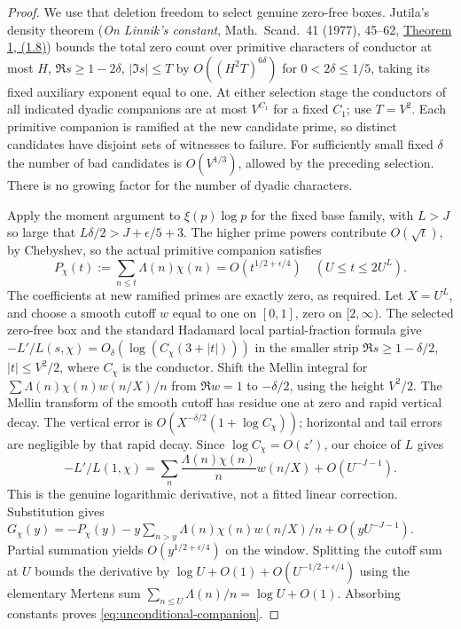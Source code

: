 \begin{proof}
We use that deletion freedom to select genuine zero-free boxes.
Jutila's density theorem (\emph{On Linnik's constant},
Math.\ Scand.\ 41 (1977), 45--62,
\href{https://www.mscand.dk/article/download/11701/9717}{Theorem 1,
(1.8)}) bounds the total zero count over primitive characters of
conductor at most \(H\), \(\Re s\ge1-2\delta\), \(|\Im s|\le T\)
by \(O((H^2T)^{6\delta})\) for \(0<2\delta\le1/5\), taking its
fixed auxiliary exponent equal to one. At either selection stage
the conductors of all indicated dyadic companions are at most
\(V^{C_1}\) for a fixed \(C_1\); use \(T=V^2\).
Each primitive companion is ramified at the new candidate prime,
so distinct candidates have disjoint sets of witnesses to failure.
For sufficiently small fixed \(\delta\) the number of bad candidates
is \(O(V^{1/3})\), allowed by the preceding selection.
There is no growing factor for the number of dyadic characters.

Apply the moment argument to \(\xi(p)\log p\) for the fixed base
family, with \(L>J\) so large that
\(L\delta/2>J+\epsilon/5+3\).
The higher prime powers contribute \(O(\sqrt t)\), by Chebyshev,
so the actual primitive companion satisfies
\[
 P_\chi(t):=\sum_{n\le t}\Lambda(n)\chi(n)
      =O(t^{1/2+\epsilon/4})\quad(U\le t\le2U^L).
\]
The coefficients at new ramified primes are exactly zero, as
required. Let \(X=U^L\), and choose a smooth cutoff \(w\) equal
to one on \([0,1]\), zero on \([2,\infty)\).
The selected zero-free box and the standard Hadamard local
partial-fraction formula give
\(-L'/L(s,\chi)=O_\delta(\log(C_\chi(3+|t|)))\) in the smaller
strip \(\Re s\ge1-\delta/2\), \(|t|\le V^2/2\), where
\(C_\chi\) is the conductor. Shift the Mellin integral for
\(\sum \Lambda(n)\chi(n)w(n/X)/n\) from \(\Re w=1\) to
\(-\delta/2\), using the height \(V^2/2\).  The Mellin transform of
the smooth cutoff has residue one at zero and rapid vertical decay.
The vertical error is \(O(X^{-\delta/2}(1+\log C_\chi))\);
horizontal and tail errors are negligible by that rapid decay.
Since \(\log C_\chi=O(z')\), our choice of \(L\) gives
\[
 -L'/L(1,\chi)=\sum_n\frac{\Lambda(n)\chi(n)}n w(n/X)
                  +O(U^{-J-1}).
\]
This is the genuine logarithmic derivative, not a fitted
linear correction.  Substitution gives
\(G_\chi(y)=-P_\chi(y)-y\sum_{n>y}\Lambda(n)\chi(n)w(n/X)/n
+O(yU^{-J-1})\).
Partial summation yields \(O(y^{1/2+\epsilon/4})\) on the window.
Splitting the cutoff sum at \(U\) bounds the derivative by
\(\log U+O(1)+O(U^{-1/2+\epsilon/4})\) using the elementary
Mertens sum \(\sum_{n\le U}\Lambda(n)/n=\log U+O(1)\).
Absorbing constants proves \eqref{eq:unconditional-companion}.


\end{proof}
